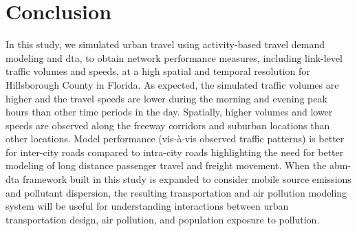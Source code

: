 \section{Conclusion}
In this study, we simulated urban travel using activity-based travel demand modeling and \gls{dta}, to obtain network performance measures, including link-level traffic volumes and speeds, at a high spatial and temporal resolution for Hillsborough County in Florida. 
As expected, the simulated traffic volumes are higher and the travel speeds are lower during the morning and evening peak hours than other time periods in the day. 
Spatially, higher volumes and lower speeds are observed along the freeway corridors and suburban locations than other locations. 
Model performance (vis-à-vis observed traffic patterns) is better for inter-city roads compared to intra-city roads highlighting the need for better modeling of long distance passenger travel and freight movement. 
When the \gls{abm}-\gls{dta} framework built in this study is expanded to consider mobile source emissions and pollutant dispersion, the resulting transportation and air pollution modeling system will be useful for understanding interactions between urban transportation design, air pollution, and population exposure to pollution.

